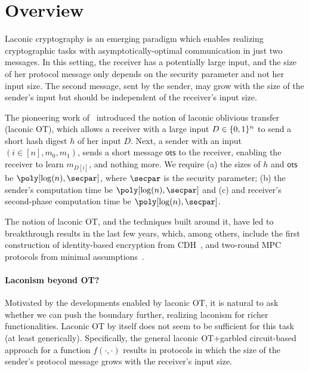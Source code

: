 \section{Overview}
Laconic cryptography \cite{C:CDGGMP17,FOCS:QuaWeeWic18,C:DGIMMO19,FOCS:DGGM19} is an emerging paradigm which enables realizing cryptographic tasks with asymptotically-optimal communication in just two messages. In this setting, the receiver has a potentially large input, and the size of her protocol message only depends on the security parameter and not her input size. The second message, sent by the sender, may grow with the size of the sender's input but should be independent of the receiver's input size.

The pioneering work of~\cite{C:CDGGMP17} introduced the notion of laconic oblivious transfer (laconic OT), which allows a receiver with a large input $D \in \{0,1\}^n$ to send a short hash digest $h$ of her input $D$. Next, a sender  with an input $(i \in [n], m_0, m_1)$, sends a short message $\mathsf{ots}$ to the receiver, enabling the receiver to learn $m_{D[i]}$, and nothing more. We require (a) the sizes of $h$ and $\mathsf{ots}$  be  $\poly[\log(n), \secpar]$, where $\secpar$ is the security parameter; (b)  the sender's computation time be $\poly[\log(n), \secpar]$ and (c) and receiver's second-phase computation time be $\poly[\log(n), \secpar]$. 

The notion of laconic OT, and the  techniques built around it, have led to breakthrough results in the last few years, which, among others, include the first construction of identity-based encryption from CDH~\cite{C:DotGar17,TCC:DotGar17,EC:BLSV18,PKC:DGHM18}, and two-round MPC protocols from minimal assumptions~\cite{FOCS:GarSri17,EC:GarSri18a,EC:BenLin18}.


\paragraph{Laconism beyond OT?} Motivated by the developments enabled by laconic OT, it is natural to ask whether we can push the boundary further, realizing laconism for richer functionalities. Laconic OT by itself does not seem to be sufficient for this task (at least generically). Specifically, the general laconic OT+garbled circuit-based approach for a function $f (\cdot, \cdot)$ results in protocols in which the size of the sender's protocol message grows with the receiver's input size. 

